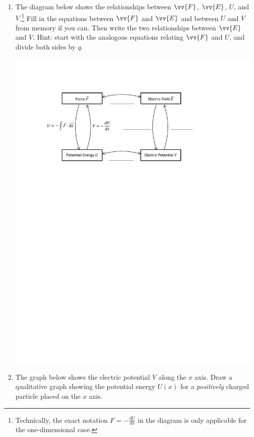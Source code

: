 \begin{enumerate}[labparts]

\item The diagram below shows the relationships between $\vv{F}$, $\vv{E}$, $U$, and $V$.\footnote{Technically, the exact notation $F=-\frac{dU}{ds}$ in the diagram is only applicable for the one-dimensional case.}
Fill in the equations between $\vv{F}$ and $\vv{E}$ and between $U$ and $V$ from memory if you can.  Then write the two relationships between $\vv{E}$ and $V$.  Hint: start with the analogous equations relating $\vv{F}$ and $U$, and divide both sides by $q$.  
\begin{center}
\includegraphics{potential_intro/concept_map_figs/concept_map_all_blanks.pdf}
\vspace*{0.2in}
\end{center}

\item The graph below shows the electric potential $V$ along the $x$ axis.  Draw a qualitative graph showing the potential energy $U(x)$ for a \textit{positively} charged particle placed on the $x$ axis.  \label{part_potential_intro_given_V}


\end{enumerate}
